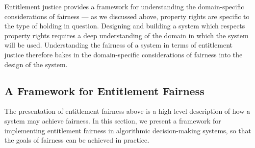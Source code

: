 Entitlement justice provides a framework for understanding the domain-specific
considerations of fairness — as we discussed above, property rights are specific
to the type of holding in question. Designing and building a system which
respects property rights requires a deep understanding of the domain in which
the system will be used. Understanding the fairness of a system in terms of 
entitlement justice therefore bakes in the domain-specific considerations of
fairness into the design of the system.

\subsection{A Framework for Entitlement Fairness}

The presentation of entitlement fairness above is a high level description of
how a system may achieve fairness. In this section, we present a framework for
implementing entitlement fairness in algorithmic decision-making systems, so 
that the goals of fairness can be achieved in practice.
